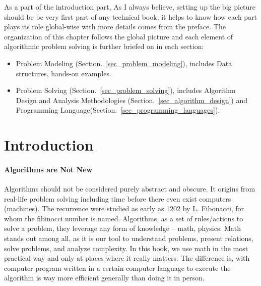\documentclass[../main.tex]{subfiles}
\begin{document}



As a part of the introduction part,  As I always believe, setting up the big picture should be be very first part of any technical book; it helps to know how each part  plays its role global-wise with  more details comes from the preface. The organization of this chapter follows the global picture and each element of algorithmic problem solving is further briefed on in each section: 
\begin{itemize}
    \item Problem Modeling (Section.~\ref{sec_problem_modeling}), includes Data structures, hands-on examples. 
    \item Problem Solving (Section.~\ref{sec_problem_solving}), includes Algorithm Design and Analysis Methodologies (Section.~\ref{sec_algorithm_design})  and Programming Language(Section.~\ref{sec_programming_languages}).
\end{itemize}

\section{Introduction}
\label{sec_history_computer_science}
\paragraph{Algorithms are Not New} Algorithms should not be considered purely abstract and obscure. It origins from real-life problem solving including time before there even exist computers (machines).  The recurrence were studied as early as 1202 by L. Fibonacci, for whom the fibinocci number is named. Algorithms, as a set of rules/actions to solve a problem, they leverage any form of knowledge -- math, physics. Math stands out among all, as it is our tool to understand problems, present relations, solve problems, and analyze complexity. In this book, we use math in the most practical way and only at places where it really matters.  The difference is, with computer program written in a certain computer language to execute the algorithm is way more efficient generally than doing it in person.   
\end{document}
